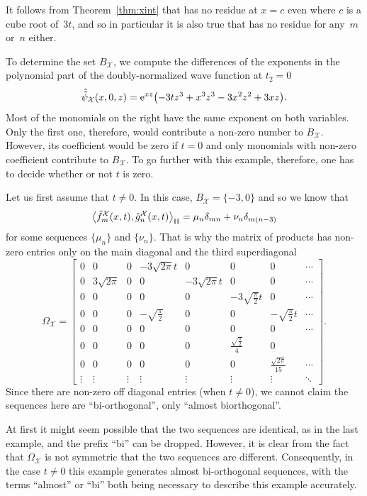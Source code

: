 \documentclass[10pt,a4paper]{amsart}
\numberwithin{equation}{section}
\theoremstyle{definition}
\def\X{\mathcal{X}}
\def\ff{\hat f}
\def\gg{\hat g}
\begin{document}
It follows from Theorem~\ref{thm:xint} that
\smash{$\hat\psi_{\X^\flat}\bigl(x,-\tfrac{1}{2},w\bigr) \hat\psi_{\X}\bigl(x,-\tfrac{1}{2},z\bigr) {\rm e}^{-x^2/2}$} has no
residue at $x=c$ even where $c$ is a cube root of~$3t$, and so in
particular it is also true that \smash{$\ff_m^{\X}(x,t)\gg_n^{\X}(x,t){\rm e}^{-x^2/2}$}
has no residue for any~$m$ or~$n$ either.

To determine the set $B_{\X}$, we compute the differences of the
exponents in the polynomial part of the doubly-normalized wave
function at $t_2=0$
\[
\hat{\hat\psi}_{\X}(x,0,z)={\rm e}^{xz}\bigl(-3 t z^3+x^3 z^3-3 x^2 z^2+3 x z\bigr).
\]
Most of the monomials on the right have the same exponent on both
variables. Only the first one, therefore, would contribute a non-zero
number to $B_{\X}$. However, its coefficient would be zero if $t=0$
and only monomials with non-zero coefficient contribute to $B_{\X}$.
To go further with this example, therefore, one has to decide whether
or not $t$ is zero.


Let us first assume that $t\not=0$.
 In this case, $B_{\X}=\{-3,0\}$ and so we know that
 \[
 \big\langle
 \ff_{m}^{\X}(x,t),\gg_n^{\X}(x,t)\big\rangle_{\rm H}=\mu_n\delta_{mn}+\nu_n\delta_{m(n-3)}
 \]
 for some sequences $\{\mu_n\}$ and $\{\nu_n\}$.
 That is why the matrix of products has non-zero
 entries only on the main diagonal and the third superdiagonal{\samepage
\[
 \Omega_{\X}=\left[\begin{matrix}
0 & 0 & 0 & -3 \sqrt{2 \pi }
 t & 0 & 0 & 0 &\cdots\\
 0 & 3 \sqrt{2 \pi } & 0 & 0 &
 -3 \sqrt{2 \pi } t & 0 & 0
&\cdots \\
 0 & 0 & 0 & 0 & 0 & -3
 \sqrt{\frac{\pi }{2}} t & 0
&\cdots \\
 0 & 0 & 0 & -\sqrt{\frac{\pi
 }{2}} & 0 & 0 &
 -\sqrt{\frac{\pi }{2}} t &\cdots\\
 0 & 0 & 0 & 0 & 0 & 0 & 0 &\cdots\\
 0 & 0 & 0 & 0 & 0 &
 \frac{\sqrt{\frac{\pi
 }{2}}}{4} & 0 \\
 0 & 0 & 0 & 0 & 0 & 0 &
 \frac{\sqrt{2 \pi }}{15} &\cdots\\
\vdots& \vdots& \vdots& \vdots& \vdots& \vdots& \vdots&\ddots
 \end{matrix}\right].
\]
Since there are non-zero off diagonal entries (when
$t\not=0$), we cannot claim the sequences here are ``bi-orthogonal'',
only ``almost biorthogonal''.}


At first it might seem possible that the two sequences are identical, as in the last example, and
the prefix ``bi'' can be dropped.
However, it is clear from the fact that $\Omega_{\X}$
is not symmetric that the two sequences are different. Consequently,
in the case $t\not=0$ this example generates almost bi-orthogonal
sequences, with the terms ``almost'' or ``bi'' both being necessary to
describe this example accurately.
\end{document}
